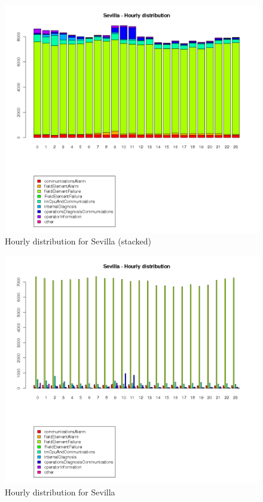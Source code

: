 \documentclass[a4paper,10pt]{article}
\begin{document}
\begin{figure}[h!]
 \centering
 \includegraphics[height=0.4\textheight]{./img/sevilla_timeline.png}
 \caption{Hourly distribution for Sevilla (stacked)}
\end{figure}
\begin{figure}[h!]
 \centering
 \includegraphics[height=0.4\textheight]{./img/sevilla_timeline_b.png}
 \caption{Hourly distribution for Sevilla}
\end{figure}
\end{document}
